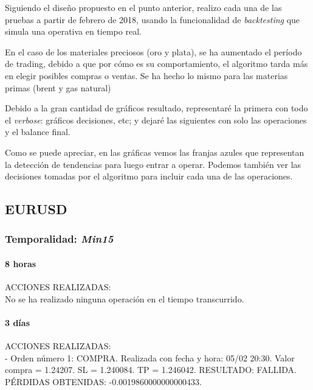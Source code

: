 Siguiendo el diseño propuesto en el punto anterior, realizo cada una de las pruebas a partir de febrero de 2018, usando la funcionalidad de \textit{backtesting} que simula una operativa en tiempo real.\newline

En el caso de los materiales preciosos (oro y plata), se ha aumentado el período de trading, debido a que por cómo es su comportamiento, el algoritmo tarda más en elegir posibles compras o ventas. Se ha hecho lo mismo para las materias primas (brent y gas natural)\newline

Debido a la gran cantidad de gráficos resultado, representaré la primera con todo el \textit{verbose}: gráficos decisiones, etc; y dejaré las siguientes con solo las operaciones y el balance final.\newline

Como se puede apreciar, en las gráficas vemos las franjas azules que representan la detección de tendencias para luego entrar a operar. Podemos también ver las decisiones tomadas por el algoritmo para incluir cada una de las operaciones.

\subsection{EURUSD}

\subsubsection{Temporalidad: \textit{Min15}}

\paragraph{8 horas} 

ACCIONES REALIZADAS:\\

No se ha realizado ninguna operación en el tiempo transcurrido.

\paragraph{3 días}

ACCIONES REALIZADAS:\\

- Orden número 1: COMPRA. Realizada con fecha y hora: 05/02 20:30. Valor compra = 1.24207. SL = 1.240084. TP = 1.246042. RESULTADO: FALLIDA. PÉRDIDAS OBTENIDAS: -0.0019860000000000433.\\

